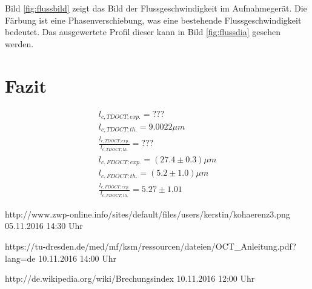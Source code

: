 \documentclass[german, %
parskip=full, %
bibliography=totoc, %
]{scrartcl}
\begin{document}
Bild \ref{fig:flussbild} zeigt das Bild der Flussgeschwindigkeit im Aufnahmegerät. Die Färbung ist eine Phasenverschiebung, was eine bestehende Flussgeschwindigkeit bedeutet. Das ausgewertete Profil dieser kann in Bild \ref{fig:flussdia} gesehen werden.

\section{Fazit}

\begin{align*}
l_{c, TD OCT; exp.} = ??? \\
l_{c, TD OCT; th.} = 9.0022 \mu m \\
\frac{l_{c, TD OCT; exp.}}{l_{c, TD OCT; th.}} = ??? \\
l_{c, FD OCT; exp.} = (27.4 \pm 0.3) \mu m \\
l_{c, FD OCT; th.} = (5.2 \pm 1.0) \mu m \\
\frac{l_{c, FD OCT; exp.}}{l_{c, FD OCT; th.}} = 5.27 \pm 1.01
\end{align*}




\begin{thebibliography}{9}

  http://www.zwp-online.info/sites/default/files/users/kerstin/kohaerenz3.png
	05.11.2016
	14:30 Uhr

  https://tu-dresden.de/med/mf/ksm/ressourcen/dateien/OCT\_Anleitung.pdf?lang=de
	10.11.2016
	14:00 Uhr

  http://de.wikipedia.org/wiki/Brechungsindex
	10.11.2016
	12:00 Uhr

\end{thebibliography}
\end{document}
